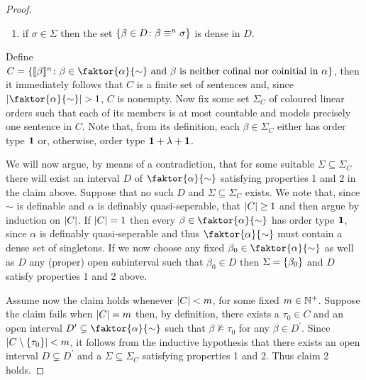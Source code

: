 \begin{proof}
\begin{claim}
\begin{enumerate}[nosep]
				\item if $\sigma\in\Sigma$ then the set $\left\lbrace \beta\in D\colon \beta\equiv^n\sigma \right\rbrace$ is dense in $D$.
			\end{enumerate}
		\end{claim}

		Define $C=\setbuild{\cha{\beta}{n}}{\beta\in\faktor{\alpha}{\sim}\text{ and }\beta\text{ is neither cofinal nor coinitial in }\alpha}$, then it immediately follows that $C$ is a finite set of sentences and, since $\card{\faktor{\alpha}{\sim}}>1$, $C$ is nonempty.  Now fix some set $\Sigma_C$ of coloured linear orders such that each of its members is at most countable and models precisely one sentence in $C$.  Note that, from its definition, each $\beta\in\Sigma_C$ either has order type $\mathbf{1}$ or, otherwise, order type $\mathbf{1}+\lambda+\mathbf{1}$.

		We will now argue, by means of a contradiction, that for some suitable $\Sigma\subseteq\Sigma_C$ there will exist an interval $D$ of $\faktor{\alpha}{\sim}$ satisfying properties 1 and 2 in the claim above.  Suppose that no such $D$ and $\Sigma\subseteq\Sigma_C$ exists.  We note that, since $\sim$ is definable and $\alpha$ is definably quasi-seperable, that $\left\lvert C\right\rvert\geq 1$ and then argue by induction on $\left\lvert C\right\rvert$.  If $\left\lvert C\right\rvert=1$ then every $\beta\in\faktor{\alpha}{\sim}$ has order type $\mathbf{1}$, since $\alpha$ is definably quasi-seperable and thus $\faktor{\alpha}{\sim}$ must contain a dense set of singletons.  If we now choose any fixed $\beta_0\in\faktor{\alpha}{\sim}$ as well as $D$ any (proper) open subinterval such that $\beta_0\in D$ then $\Sigma=\left\lbrace \beta_0\right\rbrace$ and $D$ satisfy properties 1 and 2 above.

		Assume now the claim holds whenever $\left\lvert C\right\rvert<m$, for some fixed $m\in\mathbb{N}^{+}$.  Suppose the claim fails when $\left\lvert C\right\rvert=m$ then, by definition, there exists a $\tau_0\in C$ and an open interval $D^\prime\subsetneq\faktor{\alpha}{\sim}$ such that $\beta\not\models\tau_0$ for any $\beta\in D^\prime$.  Since $\left\lvert C\setminus\left\lbrace \tau_0\right\rbrace\right\rvert<m$, it follows from the inductive hypothesis that there exists an open interval $D\subsetneq D^\prime$ and a $\Sigma\subseteq\Sigma_C$ satisfying properties 1 and 2.   Thus claim 2 holds.


\end{proof}
